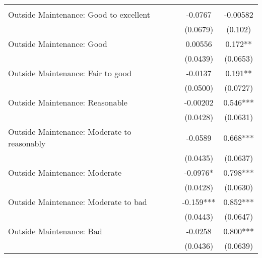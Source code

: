 \documentclass[12pt]{article}
\begin{document}
\begin{table}[H]
\begin{tabular}{lcccc}
           &            &             &             &              \\
Outside Maintenance: Good to excellent               &            &             & -0.0767     & -0.00582     \\
                                &            &             & (0.0679)    & (0.102)      \\
Outside Maintenance: Good                            &            &             & 0.00556     & 0.172**      \\
                                &            &             & (0.0439)    & (0.0653)     \\
Outside Maintenance: Fair to good                    &            &             & -0.0137     & 0.191**      \\
                                &            &             & (0.0500)    & (0.0727)     \\
Outside Maintenance: Reasonable                      &            &             & -0.00202    & 0.546***     \\
                                &            &             & (0.0428)    & (0.0631)     \\
Outside Maintenance: Moderate to reasonably          &            &             & -0.0589     & 0.668***     \\
                                &            &             & (0.0435)    & (0.0637)     \\
Outside Maintenance: Moderate                        &            &             & -0.0976*    & 0.798***     \\
                                &            &             & (0.0428)    & (0.0630)     \\
Outside Maintenance: Moderate to bad                 &            &             & -0.159***   & 0.852***     \\
                                &            &             & (0.0443)    & (0.0647)     \\
Outside Maintenance: Bad                             &            &             & -0.0258     & 0.800***     \\
                                &            &             & (0.0436)    & (0.0639)     \\

 \hline
    \end{tabular}%
  \label{tab:addlabel}%
\end{table}%
\end{document}
